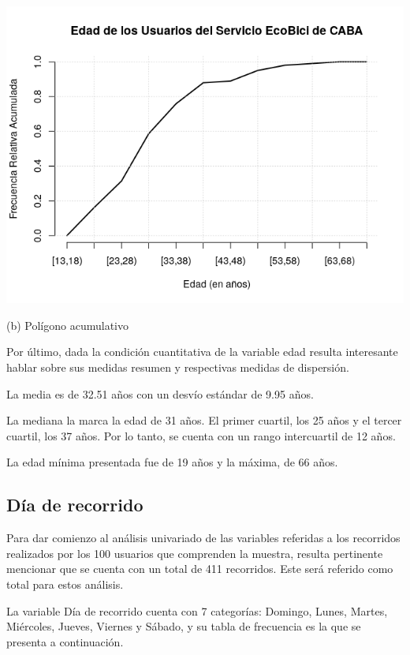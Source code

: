\documentclass[11pt]{article}
\begin{document}
    \begin{center}
    \includegraphics[scale=0.55]{PoligAcumEdad.png}
    \vspace{-4mm}

    (b) Pol\'igono acumulativo
    \end{center}

    Por \'ultimo, dada la condici\'on cuantitativa de la variable edad resulta interesante hablar sobre sus medidas resumen y respectivas medidas de dispersi\'on. 

    La media es de 32.51 a\~{n}os con un desv\'io est\'andar de 9.95 a\~{n}os.

    La mediana la marca la edad de 31 a\~{n}os. El primer cuartil, los 25 a\~{n}os y el tercer cuartil, los 37 a\~{n}os. Por lo tanto, se cuenta con un rango intercuartil de 12 a\~{n}os. 

    La edad m\'inima presentada fue de 19 a\~{n}os y la m\'axima, de 66 a\~{n}os.


  \subsection{D\'ia de recorrido}
  Para dar comienzo al an\'alisis univariado de las variables referidas a los recorridos realizados por los 100 usuarios que 
  comprenden la muestra, resulta pertinente mencionar que se cuenta con un total de 411 recorridos. Este ser\'a referido como total para estos an\'alisis. 

  La variable D\'ia de recorrido cuenta con 7 categor\'ias: Domingo, Lunes, Martes, Mi\'ercoles, Jueves, Viernes y S\'abado, y su tabla de frecuencia es la que se presenta a continuaci\'on. 
\end{document}
